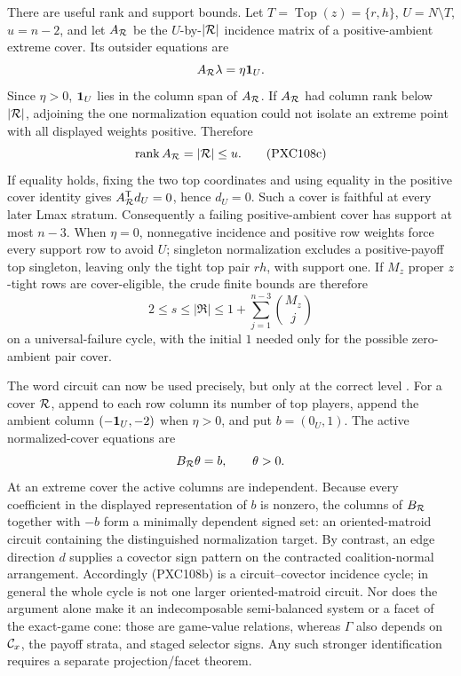 \documentclass[11pt]{article}
\begin{document}
There are useful rank and support bounds.  Let
\(T=\operatorname{Top}(z)=\{r,h\}\), \(U=N\setminus T\), \(u=n-2\), and let \(A_{\cal R}\)
be the \(U\)-by-\(|{\cal R}|\) incidence matrix of a positive-ambient
extreme cover.  Its outsider equations are
\[
 A_{\cal R}\lambda=\eta{\bf1}_U.
\]
Since \(\eta>0\), \({\bf1}_U\) lies in the column span of \(A_{\cal R}\).
If \(A_{\cal R}\) had column rank below \(|{\cal R}|\), adjoining the one
normalization equation could not isolate an extreme point with all displayed
weights positive.  Therefore
\begin{equation}
 \operatorname{rank} A_{\cal R}=|{\cal R}|\le u.              \tag{PXC108c}
\end{equation}
If equality holds, fixing the two top coordinates and using equality in the
positive cover identity gives
\(A_{\cal R}^{\mathsf T}d_U=0\), hence \(d_U=0\).  Such a cover is faithful
at every later Lmax stratum.  Consequently a failing positive-ambient cover
has support at most \(n-3\).  When \(\eta=0\), nonnegative incidence and
positive row weights force every support row to avoid \(U\); singleton
normalization excludes a positive-payoff top singleton, leaving only the
tight top pair \(rh\), with support one.  If \(M_z\) proper \(z\)-tight rows
are cover-eligible, the crude finite bounds are therefore
\[
 2\le s\le|\mathfrak R|
 \le 1+\sum_{j=1}^{n-3}\binom{M_z}{j}
\]
on a universal-failure cycle, with the initial \(1\) needed only for the
possible zero-ambient pair cover.

The word circuit can now be used precisely, but only at the correct level
\citep{BjornerEtAl1999}.
For a cover \({\cal R}\), append to each row column its number of top
players, append the ambient column
\((-{\bf1}_U,-2)\) when \(\eta>0\), and put
\(b=(0_U,1)\).  The active normalized-cover equations are
\[
             B_{\cal R}\theta=b,\qquad \theta>0.
\]
At an extreme cover the active columns are independent.  Because every
coefficient in the displayed representation of \(b\) is nonzero,
the columns of \(B_{\cal R}\) together with \(-b\) form a minimally dependent
signed set: an oriented-matroid circuit containing the distinguished
normalization target.  By contrast, an edge direction \(d\) supplies a
covector sign pattern on the contracted coalition-normal arrangement.
Accordingly (PXC108b) is a circuit--covector incidence cycle; in general the
whole cycle is not one larger oriented-matroid circuit.  Nor does the
argument alone make it an indecomposable semi-balanced system or a facet of
the exact-game cone: those are game-value relations, whereas
\(\Gamma\) also depends on \({\cal C}_x\), the payoff strata, and staged
selector signs.  Any such stronger identification requires a separate
projection/facet theorem.
\end{document}
